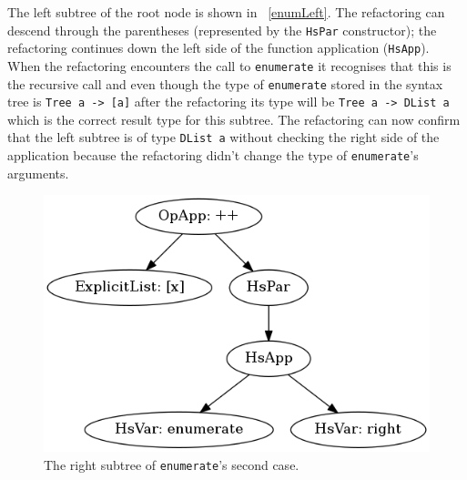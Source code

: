 The left subtree of the root node is shown in \DIFdelbegin {}\DIFdelend \DIFaddbegin {}\DIFaddend ~\ref{enumLeft}. The refactoring can descend through the parentheses (represented by the \texttt{HsPar} constructor); the refactoring continues down the left side of the function application (\texttt{HsApp}). When the refactoring encounters the call to \texttt{enumerate} it recognises that this is the recursive call and even though the type of \texttt{enumerate} stored in the syntax tree is \texttt{Tree a -> [a]} after the refactoring its type will be \texttt{Tree a -> DList a} which is the correct result type  for this subtree. The refactoring can now confirm that the left subtree is of type \texttt{DList a} without checking the right side of the application because the refactoring didn't change the type of \texttt{enumerate}'s arguments.

\begin{figure}[h]
	\begin{center}
		\includegraphics[scale=.5]{graphVis/Chapter3/enumRight.png}
	\end{center}
	\caption{The right subtree of \texttt{enumerate}'s second case.}
	\label{enumRight}
\end{figure}


